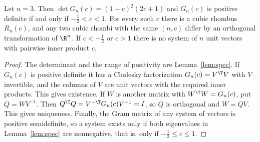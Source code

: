 \begin{theorem}\label{thm:main}
Let $n=3$. Then $\det G_n(c)=\left(1 - c\right)^{2} \left(2 c + 1\right)$ and $G_n(c)$ is positive definite if and only if $- \frac{1}{2}<c<1$.
For every such $c$ there is a cubic rhombus $R_n(c)$, and any two cubic rhombi with the same $(n,c)$ differ by an orthogonal transformation of $\R^n$.
If $c<- \frac{1}{2}$ or $c>1$ there is no system of $n$ unit vectors with pairwise inner product $c$.
\end{theorem}
\begin{proof}
The determinant and the range of positivity are Lemma~\ref{lem:spec}.
If $G_n(c)$ is positive definite it has a Cholesky factorization $G_n(c)=V^\T V$ with $V$ invertible, and the columns of $V$ are unit vectors with the required inner products. This gives existence.
If $W$ is another matrix with $W^\T W=G_n(c)$, put $Q=WV^{-1}$. Then $Q^\T Q=V^{-\T}G_n(c)V^{-1}=I$, so $Q$ is orthogonal and $W=QV$. This gives uniqueness.
Finally, the Gram matrix of any system of vectors is positive semidefinite, so a system exists only if both eigenvalues in Lemma~\ref{lem:spec} are nonnegative, that is, only if $- \frac{1}{2}\le c\le1$.
\end{proof}
